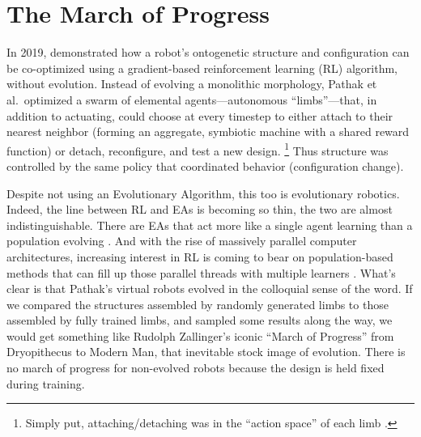 \section{The March of Progress}


In 2019, \citet{pathak19assemblies} demonstrated how a robot's 
ontogenetic structure and configuration
can be co-optimized using a gradient-based reinforcement learning (RL) algorithm, without evolution.
Instead of evolving a monolithic morphology, Pathak et al.~optimized a swarm of elemental agents---autonomous ``limbs''---that, in addition to actuating, could choose at every timestep to either attach to their nearest neighbor (forming an aggregate, symbiotic machine with a shared reward function) or detach, reconfigure, and test a new design.%
\footnote{%
Simply put,
attaching/detaching was in the ``action space'' of each limb \cite{sutton2018reinforcement}.
}
Thus structure was controlled by the same policy that coordinated 
behavior (configuration change).


Despite not using an Evolutionary Algorithm, this too is evolutionary robotics.
Indeed, the line between RL and EAs 
is becoming so thin, the two are almost indistinguishable.
There are EAs that act more like a single agent learning than a population evolving \cite{salimans2017evolution}.
And with the rise of massively parallel computer architectures,
increasing interest in RL is coming to bear on population-based methods that can fill up those parallel threads with multiple learners  \cite{jaderberg2019human}.
What's clear is that Pathak's virtual robots evolved in the colloquial sense of the word.
If we compared the structures assembled by randomly generated limbs to those assembled by fully trained limbs, and sampled some results along the way, we would get something like Rudolph Zallinger's iconic ``March of Progress'' from Dryopithecus to Modern Man, that inevitable stock image of evolution.
There is no march of progress for non-evolved robots because the design is held fixed during training.



